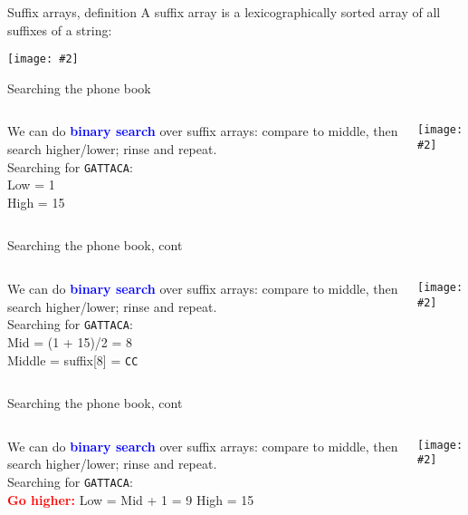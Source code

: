 \documentclass{beamer}
\renewcommand{\c}[1]{\begin{center}#1\end{center}}
\newcommand{\blu}[1]{\textcolor{blue}{\textbf{#1}}}
\newcommand{\red}[1]{\textcolor{red}{\textbf{#1}}}
\newcommand{\gr}[2][.95]{\c{\texttt{[image: \#2]}}}
\begin{document}
\begin{frame}{Suffix arrays, definition}
    A suffix array is a lexicographically sorted array of all suffixes of a string:
    \gr[0.6]{l6_figs/s7_suffix_array2.png}
\end{frame}

\begin{frame}{Searching the phone book}
    \begin{columns}
        \begin{column}{0.5\textwidth}
            We can do \blu{binary search} over suffix arrays: compare to middle, then search higher/lower; rinse and repeat.\\
            \bigskip
            Searching for \texttt{GATTACA}:\\
            \bigskip
            Low = 1\\
            High = 15
        \end{column}
        \begin{column}{0.5\textwidth}
            \gr{l6_figs/s8_phonebook.png}
        \end{column}
    \end{columns}
\end{frame}

\begin{frame}{Searching the phone book, cont}
    \begin{columns}
        \begin{column}{0.5\textwidth}
            We can do \blu{binary search} over suffix arrays: compare to middle, then search higher/lower; rinse and repeat.\\
            \bigskip
            Searching for \texttt{GATTACA}:\\
            \bigskip
            Mid = (1 + 15)/2 = 8\\
            Middle = suffix[8] = \texttt{CC}
        \end{column}
        \begin{column}{0.5\textwidth}
            \gr{l6_figs/s9_phonebook2.png}
        \end{column}
    \end{columns}
\end{frame}

\begin{frame}{Searching the phone book, cont}
    \begin{columns}
        \begin{column}{0.5\textwidth}
            We can do \blu{binary search} over suffix arrays: compare to middle, then search higher/lower; rinse and repeat.\\
            \bigskip
            Searching for \texttt{GATTACA}:\\
            \bigskip
            \red{Go higher:} Low = Mid + 1 = 9
            High = 15
        \end{column}
        \begin{column}{0.5\textwidth}
            \gr{l6_figs/s11_phonebook3.png}
        \end{column}
    \end{columns}
\end{frame}
\end{document}
